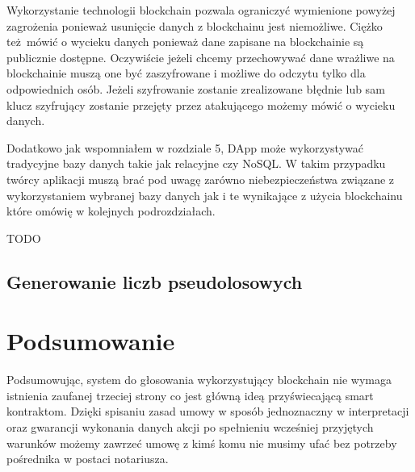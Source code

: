 \documentclass[]{llncs}
\begin{document}
  Wykorzystanie technologii blockchain pozwala ograniczyć wymienione powyżej
  zagrożenia ponieważ usunięcie danych z blockchainu jest niemożliwe. Ciężko
  też mówić o wycieku danych ponieważ dane zapisane na blockchainie są
  publicznie dostępne. Oczywiście jeżeli chcemy przechowywać dane wrażliwe na
  blockchainie muszą one być zaszyfrowane i możliwe do odczytu tylko dla
  odpowiednich osób. Jeżeli szyfrowanie zostanie zrealizowane błędnie lub sam
  klucz szyfrujący zostanie przejęty przez atakującego możemy mówić o wycieku
  danych.

  Dodatkowo jak wspomniałem w rozdziale 5, DApp może wykorzystywać tradycyjne
  bazy danych takie jak relacyjne czy NoSQL. W takim przypadku twórcy aplikacji
  muszą brać pod uwagę zarówno niebezpieczeństwa związane z wykorzystaniem
  wybranej bazy danych jak i te wynikające z użycia blockchainu które omówię w
  kolejnych podrozdziałach.

  TODO
  \cite{open-zeppelin}

\subsection{Generowanie liczb pseudolosowych}

\cite{liczby-losowe}

\section{Podsumowanie}

  Podsumowując, system do głosowania wykorzystujący blockchain nie wymaga
  istnienia zaufanej trzeciej strony co jest główną ideą przyświecającą smart
  kontraktom. Dzięki spisaniu zasad umowy w sposób jednoznaczny w interpretacji
  oraz gwarancji wykonania danych akcji po spełnieniu wcześniej przyjętych
  warunków możemy zawrzeć umowę z kimś komu nie musimy ufać bez potrzeby
  pośrednika w postaci notariusza.
\end{document}
